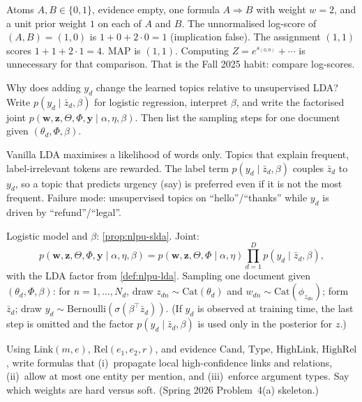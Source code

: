 \begin{example}
\label{exmp:nlpu-mln-tiny}
Atoms $A,B\in\{0,1\}$, evidence empty, one formula $A\Rightarrow B$ with weight $w=2$, and a unit prior weight $1$ on each of $A$ and $B$. The unnormalised log-score of $(A,B)=(1,0)$ is $1+0+2\cdot 0=1$ (implication false). The assignment $(1,1)$ scores $1+1+2\cdot 1=4$. MAP is $(1,1)$. Computing $Z=e^{s_{(0,0)}}+\cdots$ is unnecessary for that comparison. That is the Fall 2025 habit: compare log-scores.
\end{example}

\begin{exercise}
\label{ex:nlpu-slda}
Why does adding $y_d$ change the learned topics relative to unsupervised LDA? Write $p(y_d\mid\bar z_d,\beta)$ for logistic regression, interpret $\beta$, and write the factorised joint $p(\mathbf{w},\mathbf{z},\Theta,\Phi,\mathbf{y}\mid\alpha,\eta,\beta)$. Then list the sampling steps for one document given $(\theta_d,\Phi,\beta)$.
\end{exercise}

\begin{solution}
Vanilla LDA maximises a likelihood of words only. Topics that explain frequent, label-irrelevant tokens are rewarded. The label term $p(y_d\mid\bar z_d,\beta)$ couples $\bar z_d$ to $y_d$, so a topic that predicts urgency (say) is preferred even if it is not the most frequent. Failure mode: unsupervised topics on ``hello''/``thanks'' while $y_d$ is driven by ``refund''/``legal''.

Logistic model and $\beta$: \cref{prop:nlpu-slda}. Joint:
\[
p(\mathbf{w},\mathbf{z},\Theta,\Phi,\mathbf{y}\mid\alpha,\eta,\beta)
=
p(\mathbf{w},\mathbf{z},\Theta,\Phi\mid\alpha,\eta)
\prod_{d=1}^D
p(y_d\mid\bar z_d,\beta),
\]
with the LDA factor from \cref{def:nlpu-lda}. Sampling one document given $(\theta_d,\Phi,\beta)$: for $n=1,\dots,N_d$, draw $z_{dn}\sim\mathrm{Cat}(\theta_d)$ and $w_{dn}\sim\mathrm{Cat}(\phi_{z_{dn}})$; form $\bar z_d$; draw $y_d\sim\mathrm{Bernoulli}(\sigma(\beta^\top\bar z_d))$. (If $y_d$ is observed at training time, the last step is omitted and the factor $p(y_d\mid\bar z_d,\beta)$ is used only in the posterior for $z$.)
\end{solution}

\begin{exercise}
\label{ex:nlpu-mln-ie}
Using $\mathrm{Link}(m,e)$, $\mathrm{Rel}(e_1,e_2,r)$, and evidence $\mathrm{Cand}$, $\mathrm{Type}$, $\mathrm{HighLink}$, $\mathrm{HighRel}$, write formulas that (i)~propagate local high-confidence links and relations, (ii)~allow at most one entity per mention, and (iii)~enforce argument types. Say which weights are hard versus soft. (Spring 2026 Problem~4(a) skeleton.)
\end{exercise}

